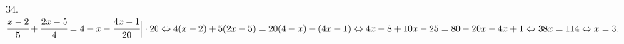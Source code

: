 34. $\cfrac{x-2}{5}+\cfrac{2x-5}{4}=4-x-\cfrac{4x-1}{20}\Big|\cdot20\Leftrightarrow
4(x-2)+5(2x-5)=20(4-x)-(4x-1)\Leftrightarrow4x-8+10x-25=80-20x-4x+1\Leftrightarrow
38x=114\Leftrightarrow x=3.$\\
